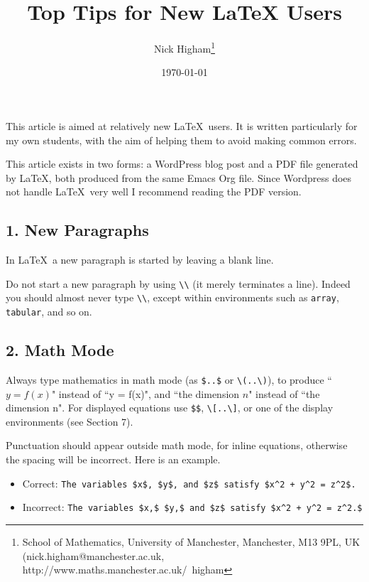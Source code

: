 \documentclass[12pt]{extarticle}
\author{Nick Higham\footnote{School of Mathematics, University of Manchester, Manchester, M13 9PL, UK (nick.higham@manchester.ac.uk, http://www.maths.manchester.ac.uk/\string~higham}}
\date{\today}
\title{Top Tips for New \LaTeX{} Users}
\begin{document}
\maketitle

\label{sec-1}

This article is aimed at relatively new \LaTeX\ users.
It is written particularly for my own students, with the aim of helping them
to avoid making common errors.

This article exists in two forms: a WordPress blog post and a PDF file
generated by \LaTeX, both produced from the same Emacs Org file.
Since Wordpress does not handle \LaTeX\ very well I recommend reading the
PDF version.

\subsection*{1. New Paragraphs}
\label{sec-1-1}
In \LaTeX\ a new paragraph is started  by leaving a blank line.

Do not start a new paragraph by using \texttt{\textbackslash{}\textbackslash{}}
(it merely terminates a line).
Indeed you should almost never type \texttt{\textbackslash{}\textbackslash{}}, except within 
environments such as \texttt{array}, \texttt{tabular}, and so on.

\subsection*{2. Math Mode}
\label{sec-1-2}
Always type mathematics in math mode (as \texttt{\$..\$} or \texttt{\textbackslash{}(..\textbackslash{})}), 
to produce ``$y = f(x)$" instead of ``y = f(x)",
and ``the dimension $n$"
instead of ``the dimension n".
For displayed equations use \texttt{\$\$}, \texttt{\textbackslash{}[..\textbackslash{}]}, or one of the display
environments (see Section 7).

Punctuation should appear outside math mode, for inline equations,
otherwise the spacing will be
incorrect. Here is an example.


\begin{itemize}
\item Correct: \texttt{The variables \$x\$, \$y\$, and \$z\$ satisfy \$x\textasciicircum{}2 + y\textasciicircum{}2 = z\textasciicircum{}2\$.}
\item Incorrect: \texttt{The variables \$x,\$ \$y,\$ and \$z\$ satisfy \$x\textasciicircum{}2 + y\textasciicircum{}2 = z\textasciicircum{}2.\$}
\end{itemize}
\end{document}
